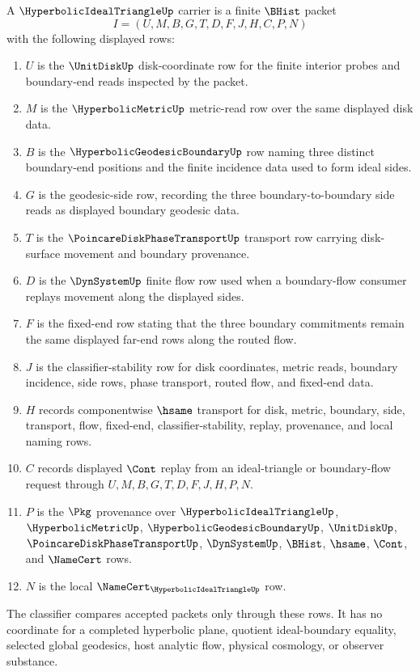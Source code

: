 \begin{definition}
\label{def:hyperbolic-ideal-triangle-carrier}
A $\HyperbolicIdealTriangleUp$ carrier is a finite $\BHist$ packet
$$
I=(U,M,B,G,T,D,F,J,H,C,P,N)
$$
with the following displayed rows:
\begin{enumerate}
\item $U$ is the $\UnitDiskUp$ disk-coordinate row for the finite interior probes and boundary-end reads inspected by the packet.
\item $M$ is the $\HyperbolicMetricUp$ metric-read row over the same displayed disk data.
\item $B$ is the $\HyperbolicGeodesicBoundaryUp$ row naming three distinct boundary-end positions and the finite incidence data used to form ideal sides.
\item $G$ is the geodesic-side row, recording the three boundary-to-boundary side reads as displayed boundary geodesic data.
\item $T$ is the $\PoincareDiskPhaseTransportUp$ transport row carrying disk-surface movement and boundary provenance.
\item $D$ is the $\DynSystemUp$ finite flow row used when a boundary-flow consumer replays movement along the displayed sides.
\item $F$ is the fixed-end row stating that the three boundary commitments remain the same displayed far-end rows along the routed flow.
\item $J$ is the classifier-stability row for disk coordinates, metric reads, boundary incidence, side rows, phase transport, routed flow, and fixed-end data.
\item $H$ records componentwise $\hsame$ transport for disk, metric, boundary, side, transport, flow, fixed-end, classifier-stability, replay, provenance, and local naming rows.
\item $C$ records displayed $\Cont$ replay from an ideal-triangle or boundary-flow request through $U,M,B,G,T,D,F,J,H,P,N$.
\item $P$ is the $\Pkg$ provenance over $\HyperbolicIdealTriangleUp$, $\HyperbolicMetricUp$, $\HyperbolicGeodesicBoundaryUp$, $\UnitDiskUp$, $\PoincareDiskPhaseTransportUp$, $\DynSystemUp$, $\BHist$, $\hsame$, $\Cont$, and $\NameCert$ rows.
\item $N$ is the local $\NameCert_{\HyperbolicIdealTriangleUp}$ row.
\end{enumerate}
The classifier compares accepted packets only through these rows. It has no coordinate for a completed hyperbolic plane, quotient ideal-boundary equality, selected global geodesics, host analytic flow, physical cosmology, or observer substance.
\end{definition}

